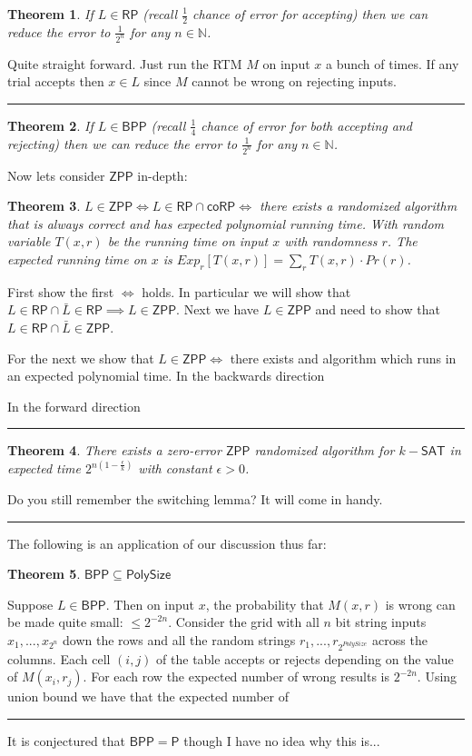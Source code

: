 \documentclass[twoside]{article}
\newcounter{lecnum}
\newtheorem{theorem}{Theorem}[lecnum]
\newenvironment{proof}{{\bf Proof:}}{\hfill\rule{2mm}{2mm}}
\def\N{\mathbb{N}}
\def\P{\mathsf{P}}
\def\BPP{\mathsf{BPP}}
\def\RP{\mathsf{RP}}
\def\ZPP{\mathsf{ZPP}}
\def\coRP{\mathsf{coRP}}
\def\SAT{\mathsf{SAT}}
\def\PolySize{\mathsf{PolySize}}
\begin{document}
\begin{theorem}
If $L \in \RP$ (recall $\frac{1}{2}$ chance of error for accepting) then we can reduce the error to $\frac{1}{2^n}$ for any $n\in \N$.
\end{theorem}
\begin{proof}
Quite straight forward. Just run the RTM $M$ on input $x$ a bunch of times. If any trial accepts then $x \in L$ since $M$ cannot be wrong on rejecting inputs.
\end{proof}

\begin{theorem}
If $L \in \BPP$ (recall $\frac{1}{4}$ chance of error for both accepting and rejecting) then we can reduce the error to $\frac{1}{2^n}$ for any $n\in \N$.
\end{theorem}

Now lets consider $\ZPP$ in-depth:
\begin{theorem}
$L \in \ZPP \iff L \in \RP \cap \coRP \iff$ there exists a randomized algorithm that is always correct and has expected polynomial running time. With random variable $T(x, r)$ be the running time on input $x$ with randomness $r$. The expected running time on $x$ is $Exp_r[T(x,r)] = \sum_r T(x,r) \cdot Pr(r)$. 	  
\end{theorem}
\begin{proof}
First show the first $\iff$ holds. In particular we will show that $L \in \RP \cap \bar{L} \in \RP \implies L \in \ZPP$. Next we have $L \in \ZPP$ and need to show that $L \in \RP \cap \bar{L} \in \ZPP$. 

For the next we show that $L \in \ZPP \iff$ there exists and algorithm which runs in an expected polynomial time. In the backwards direction 

In the forward direction 
\end{proof}

\begin{theorem}
There exists a zero-error $\ZPP$ randomized algorithm for $k-\SAT$ in expected time $2^{n(1 - \frac{\epsilon}{k})}$ with constant $\epsilon > 0$. 
\end{theorem}
\begin{proof}
Do you still remember the switching lemma? It will come in handy.
\end{proof}

The following is an application of our discussion thus far:
\begin{theorem}
$\BPP \subseteq \PolySize$
\end{theorem}
\begin{proof}
Suppose $L \in \BPP$. Then on input $x$, the probability that $M(x,r)$ is wrong can be made quite small: $\leq 2^{-2n}$. Consider the grid with all $n$ bit string inputs $x_1, ..., x_{2^n}$ down the rows and all the random strings $r_1, ..., r_{2^{PolySize}}$ across the columns. Each cell $(i,j)$ of the table accepts or rejects depending on the value of $M(x_i, r_j)$. For each row the expected number of wrong results is $2^{-2n}$. Using union bound we have that the expected number of  
\end{proof}

It is conjectured that $\BPP = \P$ though I have no idea why this is...
\end{document}
